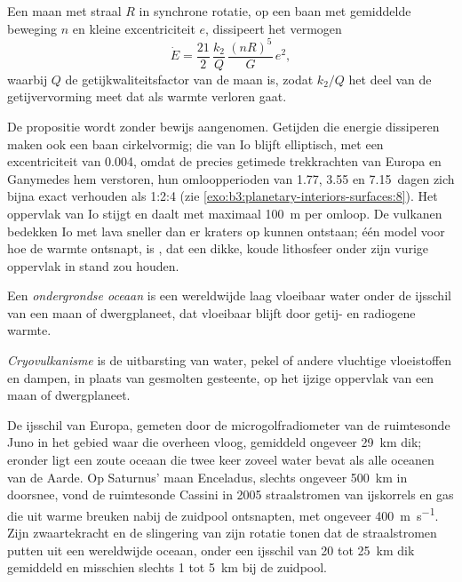 \begin{proposition}\label{prop:b3:planetary-interiors-surfaces:tidal-power}
Een maan met straal $R$ in synchrone rotatie, op een baan met gemiddelde beweging
$n$ en kleine excentriciteit $e$, dissipeert het vermogen
\[
  \dot E = \frac{21}{2}\,\frac{k_2}{Q}\,\frac{(nR)^5}{G}\,e^2 ,
\]
waarbij $Q$ de getijkwaliteitsfactor van de maan is, zodat $k_2/Q$ het
deel van de getijvervorming meet dat als warmte verloren gaat.
\end{proposition}

De propositie wordt zonder bewijs aangenomen. Getijden die energie dissiperen maken ook
een baan cirkelvormig; die van Io blijft elliptisch, met een excentriciteit van 0.004, omdat de
precies getimede trekkrachten van Europa en Ganymedes hem verstoren, hun omloopperioden
van 1.77, 3.55 en \num{7.15}~dagen zich bijna exact verhouden als
1:2:4 (zie \cref{exo:b3:planetary-interiors-surfaces:8}). Het oppervlak van Io stijgt
en daalt met maximaal \qty{100}{m} per omloop. De vulkanen
bedekken Io met lava sneller dan er kraters op kunnen ontstaan; één model voor
hoe de warmte ontsnapt, is , dat een dikke,
koude lithosfeer onder zijn vurige oppervlak in stand zou houden.

\begin{definition}\label{def:b3:planetary-interiors-surfaces:ocean-world}
Een \emph{ondergrondse oceaan} is een wereldwijde laag
vloeibaar water onder de ijsschil van een maan of dwergplaneet, dat vloeibaar blijft door
getij- en radiogene warmte.
\end{definition}

\begin{definition}[Cryovulkanisme]\label{def:b3:planetary-interiors-surfaces:cryovolcanism}
\emph{Cryovulkanisme} is de uitbarsting van water, pekel
of andere vluchtige vloeistoffen en dampen, in plaats van gesmolten gesteente, op het
ijzige oppervlak van een maan of dwergplaneet.
\end{definition}

De ijsschil van Europa, gemeten door de microgolfradiometer van de ruimtesonde Juno
in het gebied waar die overheen vloog, gemiddeld ongeveer \qty{29}{km} dik;
eronder ligt een zoute oceaan die twee keer zoveel water bevat als alle
oceanen van de Aarde. Op Saturnus' maan Enceladus, slechts ongeveer \qty{500}{km}
in doorsnee, vond de ruimtesonde Cassini in 2005 straalstromen van ijskorrels en gas
die uit warme breuken nabij de zuidpool ontsnapten, met ongeveer
\qty{400}{m.s^{-1}}. Zijn zwaartekracht en de slingering van zijn rotatie tonen
dat de straalstromen putten uit een wereldwijde oceaan, onder een ijsschil van 20 tot
\qty{25}{km} dik gemiddeld en misschien slechts 1 tot \qty{5}{km} bij de
zuidpool.

